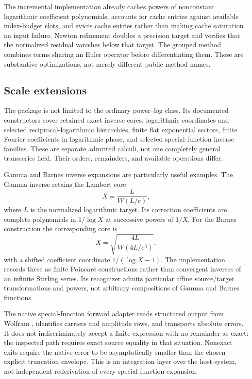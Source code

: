 \documentclass[11pt,a4paper]{article}
\newcommand{\code}[1]{\texttt{\detokenize{#1}}}
\begin{document}
The incremental implementation already caches powers of nonconstant logarithmic coefficient polynomials, accounts for cache entries against available index-budget slots, and evicts cache entries rather than making cache saturation an input failure. Newton refinement doubles a precision target and verifies that the normalized residual vanishes below that target. The grouped method combines terms sharing an Euler operator before differentiating them. These are substantive optimizations, not merely different public method names.\cite{repo-incremental}

\subsection{Scale extensions}
The package is not limited to the ordinary power--log class. Its documented constructors cover retained exact inverse cores, logarithmic coordinates and selected reciprocal-logarithmic hierarchies, finite flat exponential sectors, finite Fourier coefficients in logarithmic phase, and selected special-function inverse families. These are separate admitted calculi, not one completely general transseries field. Their orders, remainders, and available operations differ.\cite{repo-guide,repo-fourier}

Gamma and Barnes inverse expansions are particularly useful examples. The Gamma inverse retains the Lambert core
\[
 X=\frac{L}{W(L/e)},
\]
where \(L\) is the normalized logarithmic target. Its correction coefficients are complete polynomials in \(1/\log X\) at successive powers of \(1/X\). For the Barnes construction the corresponding core is
\[
 X=\sqrt{\frac{4L}{W(4L/e^3)}},
\]
with a shifted coefficient coordinate \(1/(\log X-1)\). The implementation records these as finite Poincar\'e constructions rather than convergent inverses of an infinite Stirling series. Its recognizer admits particular affine source/target transformations and powers, not arbitrary compositions of Gamma and Barnes functions.\cite{repo-gamma}

The native special-function forward adapter reads structured output from Wolfram \code{Series}, identifies carriers and amplitude rows, and transports absolute errors. It does not indiscriminately accept a finite expression with no remainder as exact: the inspected path requires exact source equality in that situation. Nonexact exits require the native error to be asymptotically smaller than the chosen explicit truncation envelope. This is an integration layer over the host system, not independent rederivation of every special-function expansion.\cite{repo-native}
\end{document}
